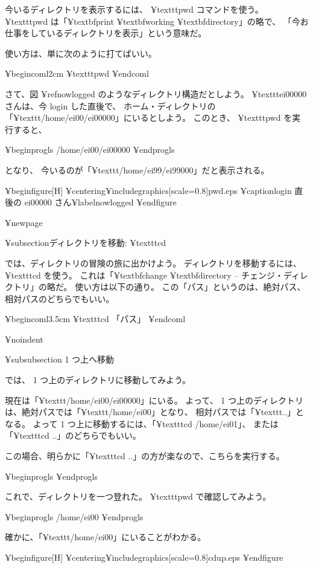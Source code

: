 {今いるディレクトリを表示するには、 ¥texttt{pwd} コマンドを使う。
 ¥texttt{pwd} は「¥textbf{p}rint ¥textbf{w}orking ¥textbf{d}irectory」の略で、
「今お仕事をしているディレクトリを表示」という意味だ。

使い方は、単に次のように打てばいい。

¥begin{coml}{2cm}
¥texttt{pwd}
¥end{coml}

さて、図 ¥ref{nowlogged} のようなディレクトリ構造だとしよう。
¥texttt{ei00000} さんは、今 login した直後で、
ホーム・ディレクトリの「¥texttt{/home/ei00/ei00000}」にいるとしよう。
このとき、 ¥texttt{pwd} を実行すると、

¥begin{progls}
/home/ei00/ei00000
%
¥end{progls}

となり、 今いるのが「¥texttt{/home/ei99/ei99000}」だと表示される。

¥begin{figure}[H]
¥centering{¥includegraphics[scale=0.8]{pwd.eps}}
¥caption{login 直後の ei00000 さん}¥label{nowlogged}
¥end{figure}

¥newpage

¥subsection{ディレクトリを移動: ¥texttt{cd}}

では、ディレクトリの冒険の旅に出かけよう。
ディレクトリを移動するには、 ¥texttt{cd} を使う。
これは「¥textbf{c}hange ¥textbf{d}irectory -- チェンジ・ディレクトリ」の略だ。
使い方は以下の通り。
この「パス」というのは、絶対パス、相対パスのどちらでもいい。

¥begin{coml}{3.5cm}
¥texttt{cd} 「パス」
¥end{coml}

¥noindent

¥subsubsection{ 1 つ上へ移動}

では、 1 つ上のディレクトリに移動してみよう。

現在は「¥texttt{/home/ei00/ei00000}」にいる。
よって、 1 つ上のディレクトリは、絶対パスでは「¥texttt{/home/ei00}」となり、
相対パスでは「¥texttt{..}」となる。
よって 1 つ上に移動するには、「¥texttt{cd /home/ei01}」、
または「¥texttt{cd ..}」のどちらでもいい。

この場合、明らかに「¥texttt{cd ..}」の方が楽なので、こちらを実行する。

¥begin{progls}
%
¥end{progls}

これで、ディレクトリを一つ登れた。
 ¥texttt{pwd} で確認してみよう。

¥begin{progls}
/home/ei00
%
¥end{progls}

確かに、「¥texttt{/home/ei00}」にいることがわかる。

¥begin{figure}[H]
¥centering{¥includegraphics[scale=0.8]{cdup.eps}}
¥end{figure}

}
